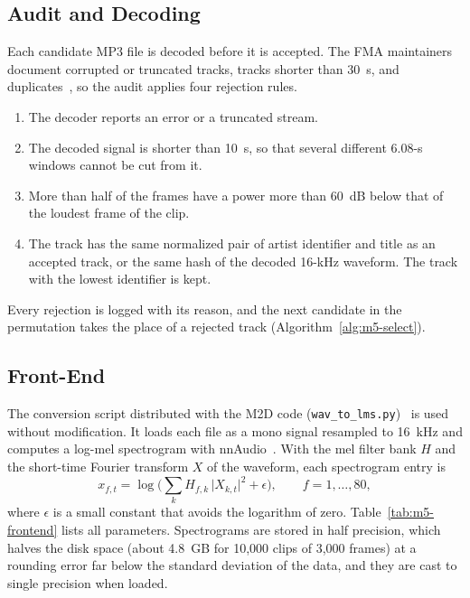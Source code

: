\documentclass{FastFyp}
\begin{document}
\subsection{Audit and Decoding}
Each candidate MP3 file is decoded before it is accepted. The FMA maintainers document corrupted or truncated tracks, tracks shorter than 30~s, and duplicates~\cite{ref:FMAGit}, so the audit applies four rejection rules.
\begin{enumerate}
  \item The decoder reports an error or a truncated stream.
  \item The decoded signal is shorter than 10~s, so that several different 6.08-s windows cannot be cut from it.
  \item More than half of the frames have a power more than 60~dB below that of the loudest frame of the clip.
  \item The track has the same normalized pair of artist identifier and title as an accepted track, or the same hash of the decoded 16-kHz waveform. The track with the lowest identifier is kept.
\end{enumerate}
Every rejection is logged with its reason, and the next candidate in the permutation takes the place of a rejected track (Algorithm~\ref{alg:m5-select}).

\subsection{Front-End}
The conversion script distributed with the M2D code (\texttt{wav\_to\_lms.py})~\cite{ref:M2DGit} is used without modification. It loads each file as a mono signal resampled to 16~kHz and computes a log-mel spectrogram with nnAudio~\cite{ref:Cheuk:2020nnaudio}. With the mel filter bank $H$ and the short-time Fourier transform $X$ of the waveform, each spectrogram entry is
\begin{equation}
x_{f,t}=\log\!\Big(\sum_{k}H_{f,k}\,\lvert X_{k,t}\rvert^{2}+\epsilon\Big),\qquad f=1,\dots,80,
\label{eq:m5-logmel}
\end{equation}
where $\epsilon$ is a small constant that avoids the logarithm of zero. Table~\ref{tab:m5-frontend} lists all parameters. Spectrograms are stored in half precision, which halves the disk space (about 4.8~GB for 10,000 clips of 3,000 frames) at a rounding error far below the standard deviation of the data, and they are cast to single precision when loaded.
\end{document}
